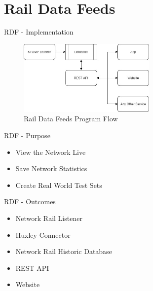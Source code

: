 \documentclass[aspectratio=169]{beamer}
\begin{document}
\section{Rail Data Feeds}

\begin{frame}{RDF - Implementation}
    \begin{figure}
        \centering
        \includegraphics[width=0.60\textwidth]{assets/RDF/rdf-flow.jpg}
        \caption{Rail Data Feeds Program Flow}
        \label{fig:rdf-flow}
    \end{figure}
\end{frame}

\begin{frame}{RDF - Purpose}
    \begin{itemize}
        \item View the Network Live
        \item Save Network Statistics
        \item Create Real World Test Sets
    \end{itemize}
\end{frame}

\begin{frame}{RDF - Outcomes}
    \begin{itemize}
        \item Network Rail Listener
        \item Huxley Connector
        \item Network Rail Historic Database
        \item REST API
        \item Website 
    \end{itemize}
\end{frame}

\end{document}
